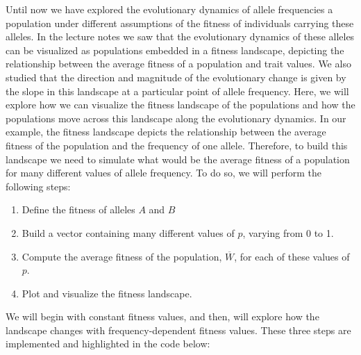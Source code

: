 \documentclass[
]{book}
\begin{document}
Until now we have explored the evolutionary dynamics of allele frequencies a population under different assumptions of the fitness of individuals carrying these alleles. In the lecture notes we saw that the evolutionary dynamics of these alleles can be visualized as populations embedded in a fitness landscape, depicting the relationship between the average fitness of a population and trait values. We also studied that the direction and magnitude of the evolutionary change is given by the slope in this landscape at a particular point of allele frequency. Here, we will explore how we can visualize the fitness landscape of the populations and how the populations move across this landscape along the evolutionary dynamics. In our example, the fitness landscape depicts the relationship between the average fitness of the population and the frequency of one allele. Therefore, to build this landscape we need to simulate what would be the average fitness of a population for many different values of allele frequency. To do so, we will perform the following steps:

\begin{enumerate}
\def\labelenumi{\arabic{enumi}.}
\item
  Define the fitness of alleles \(A\) and \(B\)
\item
  Build a vector containing many different values of \(p\), varying from 0 to 1.
\item
  Compute the average fitness of the population, \(\overline{W}\), for each of these values of \(p\).
\item
  Plot and visualize the fitness landscape.
\end{enumerate}

We will begin with constant fitness values, and then, will explore how the landscape changes with frequency-dependent fitness values. These three steps are implemented and highlighted in the code below:
\end{document}
